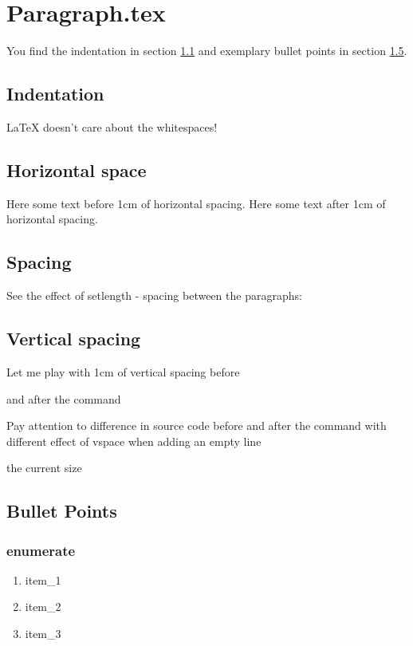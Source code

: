 \section{Paragraph.tex}
\label{paragraph}
 You find the indentation in section \ref{indentation}
and exemplary bullet points in section \ref{bullet_points}.

\subsection{Indentation}
\label{indentation}
\LaTeX{} doesn't       care    about the      whitespaces!

\subsection{Horizontal space}
Here some text before 1cm of horizontal spacing.
\hspace{1cm} 
Here some text after 1cm of horizontal spacing.


\subsection{Spacing}

See the effect of setlength - spacing between the paragraphs: 
\setlength{\parskip}{6pt}   %
\lipsum[1-3]
\renewcommand{\baselinestretch}{2}  %


\subsection{Vertical spacing}
Let me play with 1cm of vertical spacing before
\vspace{1cm} %

and after the command 

Pay attention to difference in source code before
\vspace{1cm}
and after the command with different effect of vspace when adding an empty line


                                         the current size


\subsection{Bullet Points}
\label{bullet_points}
\subsubsection{enumerate}
\begin{enumerate} %
    \item item\_1
    \item item\_2
    \item item\_3
\end{enumerate}%

